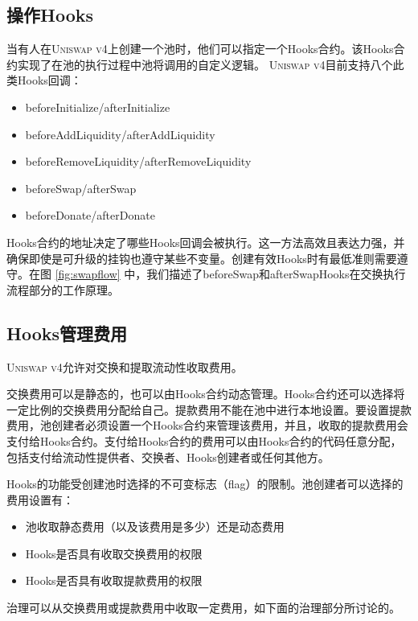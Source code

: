 \documentclass[sigconf,nonacm,prologue,table]{acmart}
\numberwithin{equation}{section}
\theoremstyle{definition}
\theoremstyle{remark}
\begin{document}
\subsection{操作Hooks} 
\label{actionhooks}

当有人在\textsc{Uniswap v4}上创建一个池时，他们可以指定一个Hooks合约。该Hooks合约实现了在池的执行过程中池将调用的自定义逻辑。 \textsc{Uniswap v4}目前支持八个此类Hooks回调：

\begin{itemize}
\item beforeInitialize/afterInitialize
\item beforeAddLiquidity/afterAddLiquidity
\item beforeRemoveLiquidity/afterRemoveLiquidity
\item beforeSwap/afterSwap
\item beforeDonate/afterDonate
\end{itemize}

Hooks合约的地址决定了哪些Hooks回调会被执行。这一方法高效且表达力强，并确保即使是可升级的挂钩也遵守某些不变量。创建有效Hooks时有最低准则需要遵守。在图 \ref{fig:swapflow} 中，我们描述了beforeSwap和afterSwapHooks在交换执行流程部分的工作原理。

\subsection{Hooks管理费用} 
\label{hookfees}

\textsc{Uniswap v4}允许对交换和提取流动性收取费用。

交换费用可以是静态的，也可以由Hooks合约动态管理。Hooks合约还可以选择将一定比例的交换费用分配给自己。提款费用不能在池中进行本地设置。要设置提款费用，池创建者必须设置一个Hooks合约来管理该费用，并且，收取的提款费用会支付给Hooks合约。支付给Hooks合约的费用可以由Hooks合约的代码任意分配，包括支付给流动性提供者、交换者、Hooks创建者或任何其他方。

Hooks的功能受创建池时选择的不可变标志（flag）的限制。池创建者可以选择的费用设置有：
\begin{itemize}
    \item 池收取静态费用（以及该费用是多少）还是动态费用
    \item Hooks是否具有收取交换费用的权限
    \item Hooks是否具有收取提款费用的权限
\end{itemize}

治理可以从交换费用或提款费用中收取一定费用，如下面的治理部分所讨论的。 
\end{document}
